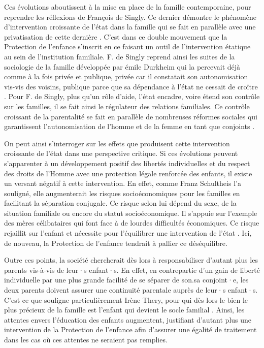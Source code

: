 \documentclass[
  12,
  a4paper,
]{report}
\begin{document}
Ces évolutions aboutissent à la mise en place de la famille
contemporaine, pour reprendre les réflexions de François de Singly. Ce
dernier démontre le phénomène d'intervention croissante de l'état dans
la famille qui se fait en parallèle avec une privatisation de cette
dernière . C'est dans ce double mouvement que la Protection de l'enfance
s'inscrit en ce faisant un outil de l'intervention étatique au sein de
l'institution familiale. F. de Singly reprend ainsi les suites de la
sociologie de la famille développée par émile Durkheim qui la percevait
déjà comme à la fois privée et publique, privée car il constatait son
autonomisation vis-vis des voisins, publique parce que sa dépendance à
l'état ne cessait de croître . Pour F. de Singly, plus qu'un rôle
d'aide, l'état encadre, voire étend son contrôle sur les familles, il se
fait ainsi le régulateur des relations familiales. Ce contrôle croissant
de la parentalité se fait en parallèle de nombreuses réformes sociales
qui garantissent l'autonomisation de l'homme et de la femme en tant que
conjoints .

On peut ainsi s'interroger sur les effets que produisent cette
intervention croissante de l'état dans une perspective critique. Si ces
évolutions peuvent s'apparenter à un développement positif des libertés
individuelles et du respect des droits de l'Homme avec une protection
légale renforcée des enfants, il existe un versant négatif à cette
intervention. En effet, comme Franz Schultheis l'a souligné, elle
augmenterait les risques socioéconomiques pour les familles en
facilitant la séparation conjugale. Ce risque selon lui dépend du sexe,
de la situation familiale ou encore du statut socioéconomique. Il
s'appuie sur l'exemple des mères célibataires qui font face à de lourdes
difficultés économiques. Ce risque rejaillit sur l'enfant et nécessite
pour l'équilibrer une intervention de l'état . Ici, de nouveau, la
Protection de l'enfance tendrait à pallier ce déséquilibre.

Outre ces points, la société chercherait dès lors à responsabiliser
d'autant plus les parents vis-à-vis de leur·s enfant·s. En effet, en
contrepartie d'un gain de liberté individuelle par une plus grande
facilité de se séparer de son.sa conjoint·e, les deux parents doivent
assurer une continuité parentale auprès de leur·s enfant·s. C'est ce que
souligne particulièrement Irène Thery, pour qui dès lors le bien le plus
précieux de la famille est l'enfant qui devient le socle familial .
Ainsi, les attentes envers l'éducation des enfants augmentent,
justifiant d'autant plus une intervention de la Protection de l'enfance
afin d'assurer une égalité de traitement dans les cas où ces attentes ne
seraient pas remplies.
\end{document}
